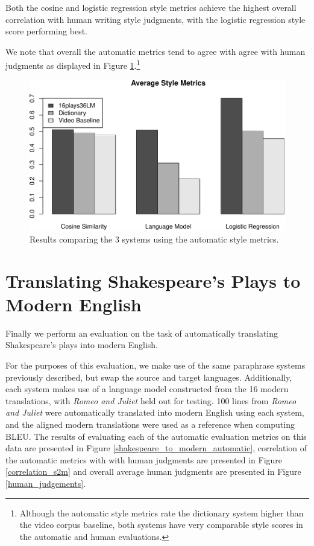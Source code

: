 \documentclass[10pt,a5paper,twoside]{article}
\begin{document}
Both the cosine and logistic regression style metrics achieve the highest overall correlation with human writing style judgments, with the logistic regression style score performing best.

We note that overall the automatic metrics tend to agree with agree with human judgments as displayed in Figure \ref{style_metrics}.\footnote{
  Although the automatic style metrics rate the dictionary system higher than the video corpus baseline, both systems have very comparable
  style scores in the automatic and human evaluations.
}

\begin{figure}
  \begin{center}
    \includegraphics[width=5in]{figures/style_metrics-crop.pdf}
    \end{center}
    \caption{Results comparing the 3 systems using the automatic style metrics.}
    \label{style_metrics}
\end{figure}

\section{Translating Shakespeare's Plays to Modern English}
Finally we perform an evaluation on the task of automatically translating Shakespeare's plays into modern English.  

For the purposes of this evaluation, 
we make use of the same paraphrase systems previously described, but swap the source and target languages.
Additionally, each system makes use of a language model constructed from the 16 modern translations, with {\em Romeo and Juliet} held out for testing.  
100 lines from {\em Romeo and Juliet} were automatically translated into modern English using each system, and the aligned modern 
translations were used as a reference when computing BLEU.  The results of evaluating each of the automatic evaluation metrics on this
data are presented in Figure \ref{shakespeare_to_modern_automatic}, correlation of the automatic metrics with with human judgments are presented in 
Figure \ref{correlation_s2m} and overall average human judgments are presented in Figure \ref{human_judgements}.
\end{document}
